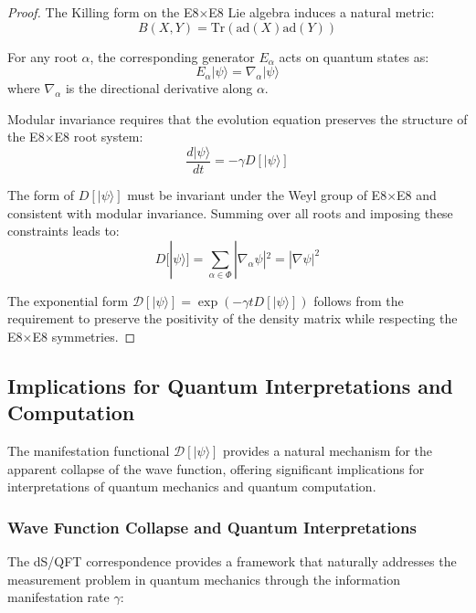 \documentclass[11pt,english,twoside]{article}
\theoremstyle{plain}
\theoremstyle{definition}
\theoremstyle{remark}
\newcommand{\D}{{\mathcal{D}}}
\newcommand{\gammaR}{\gamma}
\begin{document}
\begin{proof}
The Killing form on the E8$\times$E8 Lie algebra induces a natural metric:
\begin{equation}
B(X,Y) = \text{Tr}(\text{ad}(X)\text{ad}(Y))
\end{equation}

For any root $\alpha$, the corresponding generator $E_\alpha$ acts on quantum states as:
\begin{equation}
E_\alpha|\psi\rangle = \nabla_\alpha|\psi\rangle
\end{equation}
where $\nabla_\alpha$ is the directional derivative along $\alpha$.

Modular invariance requires that the evolution equation preserves the structure of the E8$\times$E8 root system:
\begin{equation}
\frac{d|\psi\rangle}{dt} = -\gammaR D[|\psi\rangle]
\end{equation}

The form of $D[|\psi\rangle]$ must be invariant under the Weyl group of E8$\times$E8 and consistent with modular invariance. Summing over all roots and imposing these constraints leads to:
\begin{equation}
D[|\psi\rangle] = \sum_{\alpha \in \Phi} |\nabla_\alpha\psi|^2 = |\nabla\psi|^2
\end{equation}

The exponential form $\D[|\psi\rangle] = \exp(-\gammaR t D[|\psi\rangle])$ follows from the requirement to preserve the positivity of the density matrix while respecting the E8$\times$E8 symmetries.
\end{proof}

\subsection{Implications for Quantum Interpretations and Computation}
\label{subsec:quantum_interpretations}

The manifestation functional $\D[|\psi\rangle]$ provides a natural mechanism for the apparent collapse of the wave function, offering significant implications for interpretations of quantum mechanics and quantum computation.

\subsubsection{Wave Function Collapse and Quantum Interpretations}

The dS/QFT correspondence provides a framework that naturally addresses the measurement problem in quantum mechanics through the information manifestation rate $\gammaR$:
\end{document}
